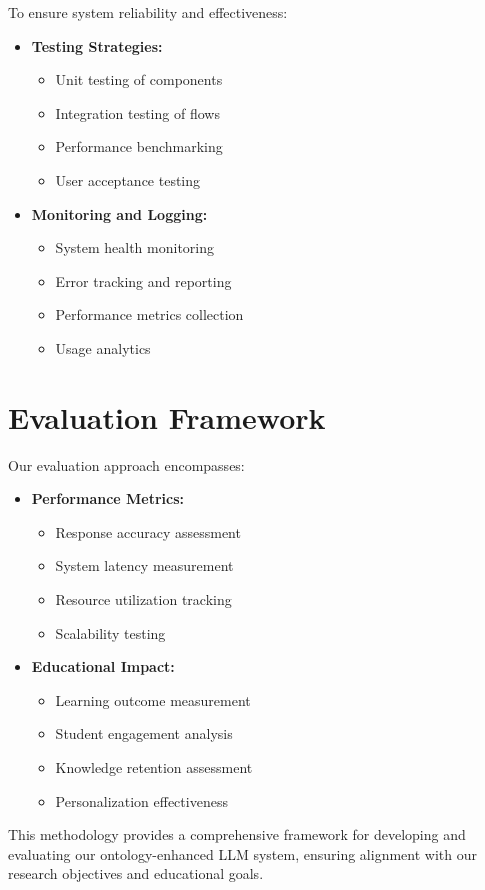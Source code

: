 To ensure system reliability and effectiveness:

\begin{itemize}
    \item \textbf{Testing Strategies:}
        \begin{itemize}
            \item Unit testing of components
            \item Integration testing of flows
            \item Performance benchmarking
            \item User acceptance testing
        \end{itemize}
    
    \item \textbf{Monitoring and Logging:}
        \begin{itemize}
            \item System health monitoring
            \item Error tracking and reporting
            \item Performance metrics collection
            \item Usage analytics
        \end{itemize}
\end{itemize}

\section{Evaluation Framework}
\label{sec:evaluation-framework}

Our evaluation approach encompasses:

\begin{itemize}
    \item \textbf{Performance Metrics:}
        \begin{itemize}
            \item Response accuracy assessment
            \item System latency measurement
            \item Resource utilization tracking
            \item Scalability testing
        \end{itemize}
    
    \item \textbf{Educational Impact:}
        \begin{itemize}
            \item Learning outcome measurement
            \item Student engagement analysis
            \item Knowledge retention assessment
            \item Personalization effectiveness
        \end{itemize}
\end{itemize}

This methodology provides a comprehensive framework for developing and evaluating our ontology-enhanced LLM system, ensuring alignment with our research objectives and educational goals. 